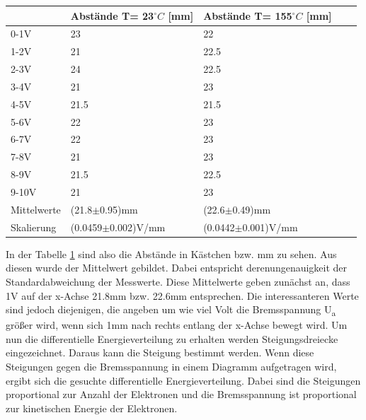 \begin{minipage}{\linewidth}
    \begin{table}[H]
        \centering
    
    \begin{tabular}{lllll}
        \toprule
         & Abstände T= 23$^\circ C$ [mm] & Abstände T= 155$^\circ C$ [mm]\\
        \midrule
        0-1V  & 23 & 22     \\
        1-2V  & 21 & 22.5   \\
        2-3V  & 24 & 22.5   \\
        3-4V  & 21 & 23     \\
        4-5V  & 21.5 & 21.5 \\
        5-6V  & 22 & 23     \\
        6-7V  & 22 & 23     \\
        7-8V  & 21 & 23     \\
        8-9V  & 21.5 & 22.5 \\
        9-10V & 21 & 23     \\
        \midrule
        Mittelwerte & (21.8$\pm$0.95)mm & (22.6$\pm$0.49)mm \\
        Skalierung & (0.0459$\pm$0.002)V/mm & (0.0442$\pm$0.001)V/mm \\
        \bottomrule
        
    \end{tabular}
    \label{tab:1}
    \end{table}
    \end{minipage}

\noindent In der Tabelle \ref{tab:1} sind also die Abstände in Kästchen bzw. mm zu sehen. Aus diesen wurde der Mittelwert gebildet. Dabei entspricht derenungenauigkeit der Standardabweichung der Messwerte. Diese Mittelwerte geben zunächst an, dass 1V auf der x-Achse 21.8mm bzw. 22.6mm entsprechen. Die interessanteren Werte sind jedoch diejenigen, die angeben um wie viel Volt die Bremsspannung U\textsubscript{a} größer wird, wenn sich 1mm nach rechts entlang der x-Achse bewegt wird. 
\noindent Um nun die differentielle Energieverteilung zu erhalten werden Steigungsdreiecke eingezeichnet. Daraus kann die Steigung bestimmt werden. Wenn diese Steigungen gegen die Bremsspannung in einem Diagramm aufgetragen wird, ergibt sich die gesuchte differentielle Energieverteilung. Dabei sind die Steigungen proportional zur Anzahl der Elektronen und die Bremsspannung ist proportional zur kinetischen Energie der Elektronen. 

